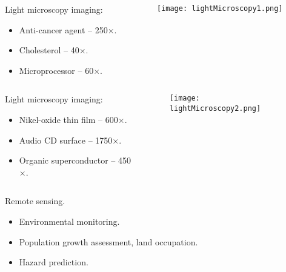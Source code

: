 
\begin{frame}
\begin{columns}
\begin{column}{.48\textwidth}
Light microscopy imaging:
\begin{itemize}
\item Anti-cancer agent -- 250$\times$.
\item Cholesterol -- 40$\times$.
\item Microprocessor -- 60$\times$.
\end{itemize}
\end{column}
\begin{column}{.48\textwidth}
\begin{figure}
\texttt{[image: lightMicroscopy1.png]}
\end{figure}
\end{column}
\end{columns}
\end{frame}


\begin{frame}
\begin{columns}
\begin{column}{.48\textwidth}
Light microscopy imaging:
\begin{itemize}
\item Nikel-oxide thin film -- 600$\times$.
\item Audio CD surface -- 1750$\times$.
\item Organic superconductor -- 450$\times$.
\end{itemize}
\end{column}
\begin{column}{.48\textwidth}
\begin{figure}
\texttt{[image: lightMicroscopy2.png]}
\end{figure}
\end{column}
\end{columns}
\end{frame}


\begin{frame}
Remote sensing.
\begin{itemize}
\item Environmental monitoring.
\item Population growth assessment, land occupation.
\item Hazard prediction.
\end{itemize}
\end{frame}

